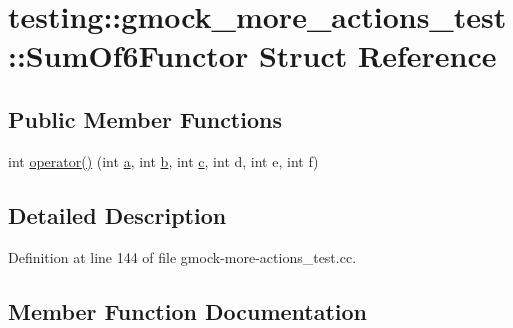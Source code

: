 \hypertarget{structtesting_1_1gmock__more__actions__test_1_1_sum_of6_functor}{}\section{testing\+:\+:gmock\+\_\+more\+\_\+actions\+\_\+test\+:\+:Sum\+Of6\+Functor Struct Reference}
\label{structtesting_1_1gmock__more__actions__test_1_1_sum_of6_functor}
\subsection*{Public Member Functions}
\begin{DoxyCompactItemize}
\item 
int \hyperlink{structtesting_1_1gmock__more__actions__test_1_1_sum_of6_functor_adc0cc4dbd423db7298497b8a9630067e}{operator()} (int \hyperlink{_07copy_08_2_read_camera_model_8m_a551a3d351eadcc0b9b1a2f24f0fb5ea0}{a}, int \hyperlink{jquery_8js_a2fa551895933fae935a0a6b87282241d}{b}, int \hyperlink{jquery_8js_abce695e0af988ece0826d9ad59b8160d}{c}, int d, int e, int f)
\end{DoxyCompactItemize}


\subsection{Detailed Description}


Definition at line 144 of file gmock-\/more-\/actions\+\_\+test.\+cc.



\subsection{Member Function Documentation}
